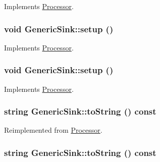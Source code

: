 Implements \hyperlink{classProcessor_18cdeefafbd8225cb3ad18dd098c0e08}{Processor}.\hypertarget{classGenericSink_0ed90ea7e6e66cfa8b9935b50ef0051d}{
\subsubsection[{setup}]{\setlength{\rightskip}{0pt plus 5cm}void GenericSink::setup ()}}
\label{classGenericSink_0ed90ea7e6e66cfa8b9935b50ef0051d}




Implements \hyperlink{classProcessor_495fad01358e2d9760c526d6e2db53ea}{Processor}.\hypertarget{classGenericSink_0ed90ea7e6e66cfa8b9935b50ef0051d}{
\subsubsection[{setup}]{\setlength{\rightskip}{0pt plus 5cm}void GenericSink::setup ()}}
\label{classGenericSink_0ed90ea7e6e66cfa8b9935b50ef0051d}




Implements \hyperlink{classProcessor_495fad01358e2d9760c526d6e2db53ea}{Processor}.\hypertarget{classGenericSink_a1703a08208816130a4ee2f4d4a8334f}{
\subsubsection[{toString}]{\setlength{\rightskip}{0pt plus 5cm}string GenericSink::toString () const}}
\label{classGenericSink_a1703a08208816130a4ee2f4d4a8334f}




Reimplemented from \hyperlink{classProcessor_d3bdbedfbb00b05f61504e411a418106}{Processor}.\hypertarget{classGenericSink_a1703a08208816130a4ee2f4d4a8334f}{
\subsubsection[{toString}]{\setlength{\rightskip}{0pt plus 5cm}string GenericSink::toString () const}}
\label{classGenericSink_a1703a08208816130a4ee2f4d4a8334f}




